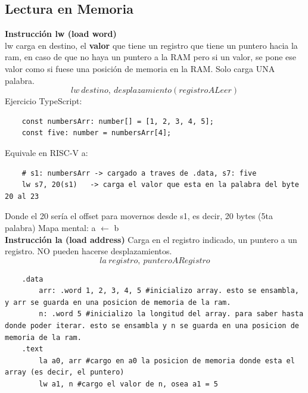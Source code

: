 \documentclass[10pt,a4paper]{article}
\begin{document}
\subsection*{Lectura en Memoria} 
\textbf{Instrucción lw (load word)} \\ 
lw carga en destino, el \textbf{valor} que tiene un registro que tiene un puntero hacia la ram, en caso de que no haya un puntero a la RAM pero si un valor, se pone ese valor como si fuese una posición de memoria en la RAM. Solo carga UNA palabra. \\ 
\[lw \ destino, \ desplazamiento(registroALeer)\]
Ejercicio TypeScript: 
\begin{lstlisting}
    const numbersArr: number[] = [1, 2, 3, 4, 5];
    const five: number = numbersArr[4];
\end{lstlisting}
Equivale en RISC-V a:
\begin{lstlisting}
    # s1: numbersArr -> cargado a traves de .data, s7: five
    lw s7, 20(s1)   -> carga el valor que esta en la palabra del byte 20 al 23
\end{lstlisting}
Donde el 20 sería el offset para movernos desde s1, es decir, 20 bytes (5ta palabra) 
Mapa mental: a \( \leftarrow \) b \\
\textbf{Instrucción la (load address)}
Carga en el registro indicado, un puntero a un registro. NO pueden hacerse desplazamientos.
\[la \ registro, \ punteroARegistro\]
\begin{lstlisting}
    .data
        arr: .word 1, 2, 3, 4, 5 #inicializo array. esto se ensambla, y arr se guarda en una posicion de memoria de la ram.
        n: .word 5 #inicializo la longitud del array. para saber hasta donde poder iterar. esto se ensambla y n se guarda en una posicion de memoria de la ram.
    .text
        la a0, arr #cargo en a0 la posicion de memoria donde esta el array (es decir, el puntero)
        lw a1, n #cargo el valor de n, osea a1 = 5
\end{lstlisting}
\end{document}
